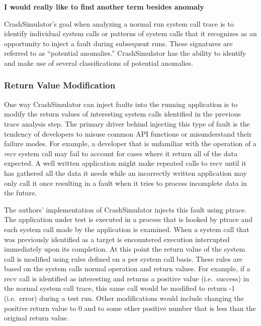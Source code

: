         \textbf{I would really like to find another term besides anomaly}

        CrashSimulator's goal when analyzing a normal run system call trace is to identify individual system calls or
        patterns of system calls that it recognizes as an opportunity to inject a fault during subsequent runs. These
        signatures are referred to as ``potential anomalies.'' CrashSimulator has the ability to identify and make use
        of several classifications of potential anomalies.

        \subsubsection{Return Value Modification}

            One way CrashSimulator can inject faults into the running application is to modify the return values of
            interesting system calls identified in the previous trace analysis step. The primary driver behind injecting
            this type of fault is the tendency of developers to misuse common API functions or misunderstand their
            failure modes. For example, a developer that is unfamiliar with the operation of a \emph{recv} system call
            may fail to account for cases where it return all of the data expected. A well written application might
            make repeated calls to recv until it has gathered all the data it needs while an incorrectly written
            application may only call it once resulting in a fault when it tries to process incomplete data in the
            future.

            The authors' implementation of CrashSimulator injects this fault using ptrace. The application under test is
            executed in a process that is hooked by ptrace and each system call made by the application is examined.
            When a system call that was previously identified as a target is encountered execution interrupted
            immediately upon its completion. At this point the return value of the system call is modified using rules
            defined on a per system call basis. These rules are based on the system calls normal operation and return
            values. For example, if a recv call is identified as interesting and returns a positive value (i.e.\ success)
            in the normal system call trace, this same call would be modified to return -1 (i.e.\ error) during a test
            run. Other modifications would include changing the positive return value to 0 and to some other positive
            number that is less than the original return value.

